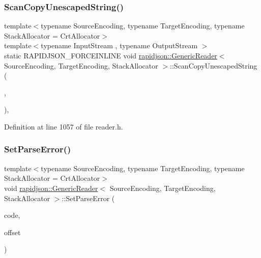\subsubsection{\texorpdfstring{ScanCopyUnescapedString()}{ScanCopyUnescapedString()}}
{\footnotesize\ttfamily template$<$typename Source\+Encoding, typename Target\+Encoding, typename Stack\+Allocator = Crt\+Allocator$>$ \\
template$<$typename Input\+Stream , typename Output\+Stream $>$ \\
static R\+A\+P\+I\+D\+J\+S\+O\+N\+\_\+\+F\+O\+R\+C\+E\+I\+N\+L\+I\+NE void \mbox{\hyperlink{classrapidjson_1_1_generic_reader}{rapidjson\+::\+Generic\+Reader}}$<$ Source\+Encoding, Target\+Encoding, Stack\+Allocator $>$\+::Scan\+Copy\+Unescaped\+String (\begin{DoxyParamCaption}\item[{Input\+Stream \&}]{,  }\item[{Output\+Stream \&}]{ }\end{DoxyParamCaption})\hspace{0.3cm}{\ttfamily [static]}, {\ttfamily [private]}}



Definition at line 1057 of file reader.\+h.


\begin{DoxyCode}{0}

\end{DoxyCode}
\mbox{\label{classrapidjson_1_1_generic_reader_a544704abdce535d93ae0f45d0cf0bc0d}} 
\subsubsection{\texorpdfstring{SetParseError()}{SetParseError()}}
{\footnotesize\ttfamily template$<$typename Source\+Encoding, typename Target\+Encoding, typename Stack\+Allocator = Crt\+Allocator$>$ \\
void \mbox{\hyperlink{classrapidjson_1_1_generic_reader}{rapidjson\+::\+Generic\+Reader}}$<$ Source\+Encoding, Target\+Encoding, Stack\+Allocator $>$\+::Set\+Parse\+Error (\begin{DoxyParamCaption}\item[{\mbox{\hyperlink{group___r_a_p_i_d_j_s_o_n___e_r_r_o_r_s_ga7d3acf640886b1f2552dc8c4cd6dea60}{Parse\+Error\+Code}}}]{code,  }\item[{size\+\_\+t}]{offset }\end{DoxyParamCaption})\hspace{0.3cm}{\ttfamily [protected]}}



